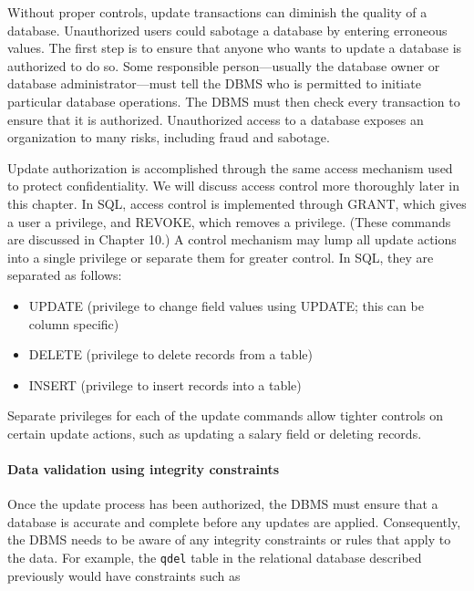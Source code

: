 \documentclass[
]{article}
\begin{document}
Without proper controls, update transactions can diminish the quality of
a database. Unauthorized users could sabotage a database by entering
erroneous values. The first step is to ensure that anyone who wants to
update a database is authorized to do so. Some responsible
person---usually the database owner or database administrator---must
tell the DBMS who is permitted to initiate particular database
operations. The DBMS must then check every transaction to ensure that it
is authorized. Unauthorized access to a database exposes an organization
to many risks, including fraud and sabotage.

Update authorization is accomplished through the same access mechanism
used to protect confidentiality. We will discuss access control more
thoroughly later in this chapter. In SQL, access control is implemented
through GRANT, which gives a user a privilege, and REVOKE, which removes
a privilege. (These commands are discussed in Chapter 10.) A control
mechanism may lump all update actions into a single privilege or
separate them for greater control. In SQL, they are separated as
follows:

\begin{itemize}
\item
  UPDATE (privilege to change field values using UPDATE; this can be
  column specific)
\item
  DELETE (privilege to delete records from a table)
\item
  INSERT (privilege to insert records into a table)
\end{itemize}

Separate privileges for each of the update commands allow tighter
controls on certain update actions, such as updating a salary field or
deleting records.

\hypertarget{data-validation-using-integrity-constraints}{%
\paragraph*{Data validation using integrity constraints}\label{data-validation-using-integrity-constraints}}

Once the update process has been authorized, the DBMS must ensure that a
database is accurate and complete before any updates are applied.
Consequently, the DBMS needs to be aware of any integrity constraints or
rules that apply to the data. For example, the \texttt{qdel} table in the
relational database described previously would have constraints such as
\end{document}
